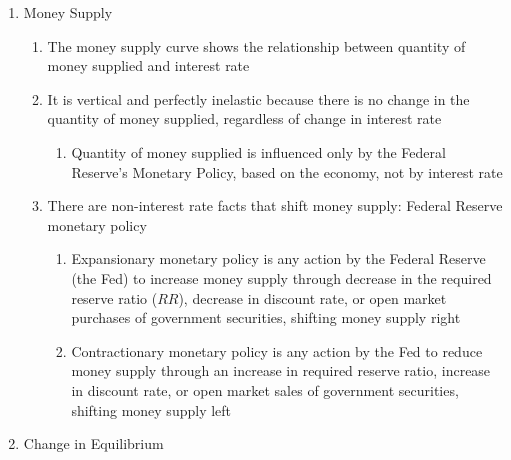 \documentclass[12pt]{article}
\begin{document}
\begin{enumerate}
\begin{enumerate}
\begin{enumerate}
            \end{enumerate}

        \end{enumerate}
        
      \item Money Supply

        \begin{enumerate}

          \item The money supply curve shows the relationship between quantity of money supplied and interest rate

          \item It is vertical and perfectly inelastic because there is no change in the quantity of money supplied, regardless of change in interest rate

            \begin{enumerate}

              \item Quantity of money supplied is influenced only by the Federal Reserve's Monetary Policy, based on the economy, not by interest rate

            \end{enumerate}

          \item There are non-interest rate facts that shift money supply: Federal Reserve monetary policy

            \begin{enumerate}

              \item Expansionary monetary policy is any action by the Federal Reserve (the Fed) to increase money supply through decrease in the required reserve ratio ($RR$), decrease in discount rate, or open market purchases of government securities, shifting money supply right

              \item Contractionary monetary policy is any action by the Fed to reduce money supply through an increase in required reserve ratio, increase in discount rate, or open market sales of government securities, shifting money supply left

            \end{enumerate}

        \end{enumerate}

      \item Change in Equilibrium


\end{enumerate}
\end{document}
